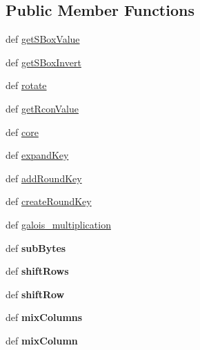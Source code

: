 \subsection*{Public Member Functions}
\begin{DoxyCompactItemize}
\item 
def \hyperlink{classslowaes_1_1_a_e_s_aa2c1b93af3bc1093e49da43396d7c185}{get\-S\-Box\-Value}
\item 
def \hyperlink{classslowaes_1_1_a_e_s_ae05b5fd6c0ba34f0ae12bda1032de765}{get\-S\-Box\-Invert}
\item 
def \hyperlink{classslowaes_1_1_a_e_s_a120952cf1cdadf630d354c9f5d486827}{rotate}
\item 
def \hyperlink{classslowaes_1_1_a_e_s_aeb77801bcddcfaf773411f1ed1de7cf0}{get\-Rcon\-Value}
\item 
def \hyperlink{classslowaes_1_1_a_e_s_a3260f08a895b18ac4d3c6ed64399c381}{core}
\item 
def \hyperlink{classslowaes_1_1_a_e_s_aab63d9aae74c2dde845f6c141c442fff}{expand\-Key}
\item 
def \hyperlink{classslowaes_1_1_a_e_s_a0ecc6c884f8e17c638ecb395bd4c7451}{add\-Round\-Key}
\item 
def \hyperlink{classslowaes_1_1_a_e_s_a97806d5c92847ff95c633154c0999557}{create\-Round\-Key}
\item 
def \hyperlink{classslowaes_1_1_a_e_s_af4dc67c05476fc947a6cd63ba7ff181f}{galois\-\_\-multiplication}
\item 
\hypertarget{classslowaes_1_1_a_e_s_a5c32f6d6aa8ae610ee82df3d426343f0}{def {\bfseries sub\-Bytes}}\label{classslowaes_1_1_a_e_s_a5c32f6d6aa8ae610ee82df3d426343f0}

\item 
\hypertarget{classslowaes_1_1_a_e_s_adeecbb0fad271f759c45765a9975dab7}{def {\bfseries shift\-Rows}}\label{classslowaes_1_1_a_e_s_adeecbb0fad271f759c45765a9975dab7}

\item 
\hypertarget{classslowaes_1_1_a_e_s_ae0586d29742a343fc50272c3219789d7}{def {\bfseries shift\-Row}}\label{classslowaes_1_1_a_e_s_ae0586d29742a343fc50272c3219789d7}

\item 
\hypertarget{classslowaes_1_1_a_e_s_a41996a1feabe5619414beffff68064d2}{def {\bfseries mix\-Columns}}\label{classslowaes_1_1_a_e_s_a41996a1feabe5619414beffff68064d2}

\item 
\hypertarget{classslowaes_1_1_a_e_s_ace6afd6a0442d9e4d812e117d9d8242c}{def {\bfseries mix\-Column}}\label{classslowaes_1_1_a_e_s_ace6afd6a0442d9e4d812e117d9d8242c}


\end{DoxyCompactItemize}
